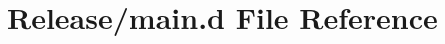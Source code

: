 \hypertarget{_release_2main_8d}{\section{Release/main.d File Reference}
\label{d4/df6/_release_2main_8d}
}
